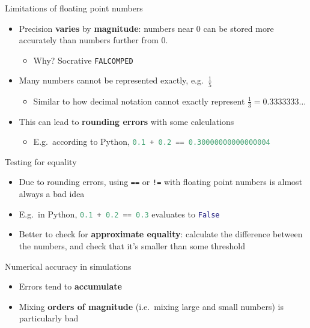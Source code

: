 \begin{frame}{Limitations of floating point numbers}
	\begin{itemize}
		\pause\item Precision \textbf{varies} by \textbf{magnitude}: numbers near 0 can be stored more accurately
			than numbers further from 0.
			\begin{itemize}
				\pause\item Why? Socrative \texttt{FALCOMPED}
			\end{itemize}
		\pause\item Many numbers cannot be represented exactly, e.g.\ $\frac15$
			\begin{itemize}
				\pause\item Similar to how decimal notation cannot exactly represent
					$\frac13 = 0.3333333\dots$
			\end{itemize}
		\pause\item This can lead to \textbf{rounding errors} with some calculations
			\begin{itemize}
				\pause\item E.g.\ according to Python,
					\lstinline[language=Python]{0.1 + 0.2 == 0.30000000000000004}
			\end{itemize}
	\end{itemize}
\end{frame}

\begin{frame}{Testing for equality}
	\begin{itemize}
		\pause\item Due to rounding errors, using \lstinline{==} or \lstinline{!=} with floating point numbers is almost always a bad idea
		\pause\item E.g.\ in Python, \lstinline[language=Python]{0.1 + 0.2 == 0.3} evaluates to \lstinline[language=Python]{False}
		\pause\item Better to check for \textbf{approximate equality}: calculate the difference between the numbers,
			and check that it's smaller than some threshold
	\end{itemize}
\end{frame}

\begin{frame}{Numerical accuracy in simulations}
	\begin{itemize}
		\pause\item Errors tend to \textbf{accumulate}
		\pause\item Mixing \textbf{orders of magnitude} (i.e.\ mixing large and small numbers) is particularly bad
	\end{itemize}
\end{frame}

